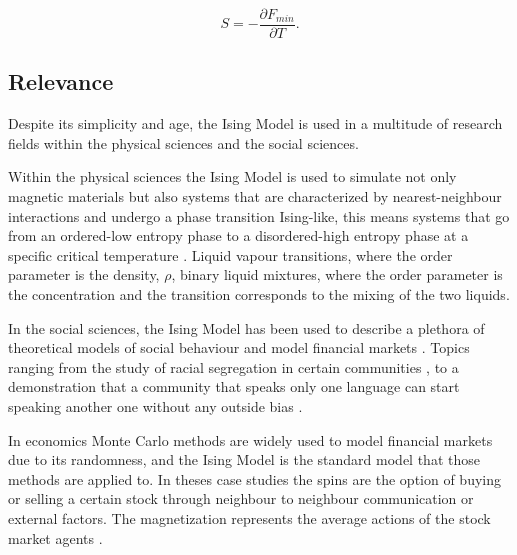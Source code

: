 \begin{equation}
	S = - \frac{\partial F_{min}}{\partial T}.
\end{equation}

\subsection{Relevance}

Despite its simplicity and age, the Ising Model is used in a multitude of research fields within the physical sciences and the social sciences. 

Within the physical sciences the Ising Model is used to simulate not only magnetic materials but also systems that are characterized by nearest-neighbour interactions and undergo a phase transition Ising-like, this means systems that go from an ordered-low entropy phase to a disordered-high entropy phase at a specific critical temperature \cite{Pelissetto2002}. 
Liquid vapour transitions, where the order parameter is the density, $\rho$, binary liquid mixtures, where the order parameter is the concentration and the transition corresponds to the mixing of the two liquids.

In the social sciences, the Ising Model has been used to describe a plethora of theoretical models of social behaviour and model financial markets \cite{review_social_ising}. 
Topics ranging from the study of racial segregation in certain communities \cite{segregation}, to a demonstration that a community that speaks only one language can start speaking another one without any outside bias \cite{language_ising}.

In economics Monte Carlo methods are widely used to model financial markets due to its randomness, and the Ising Model is the standard model that those methods are applied to. In theses case studies the spins are the option of buying or selling a certain stock through neighbour to neighbour communication or external factors. The magnetization represents the average actions of the stock market agents \cite{stock_ising, eco_thesis}.












